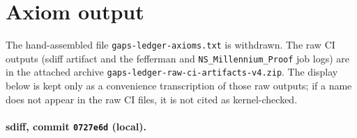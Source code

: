 \documentclass[11pt]{article}
\theoremstyle{plain}
\theoremstyle{definition}
\theoremstyle{remark}
\newcommand{\sdiffsha}{0727e6d}
\begin{document}
\appendix
\section{Axiom output}
\label{app:axioms}

The hand-assembled file \texttt{gaps-ledger-axioms.txt} is withdrawn. The raw CI outputs (sdiff artifact and the fefferman and \texttt{NS\_Millennium\_Proof} job logs) are in the attached archive \texttt{gaps-ledger-raw-ci-artifacts-v4.zip}. The display below is kept only as a convenience transcription of those raw outputs; if a name does not appear in the raw CI files, it is not cited as kernel-checked.

\paragraph{sdiff, commit \texttt{\sdiffsha} (local).}
\end{document}
